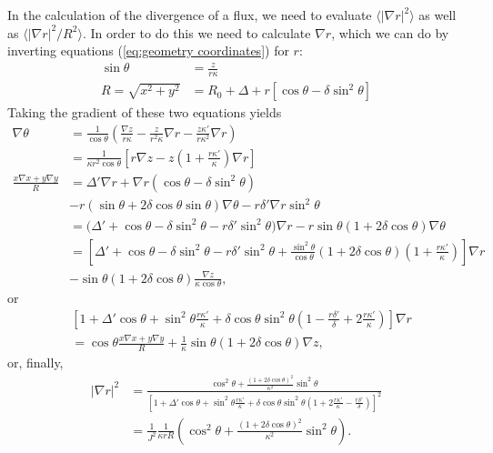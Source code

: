 \documentclass[11pt,a4paper]{article}
\begin{document}
In the calculation of the divergence of a flux, we need to evaluate $\langle |\nabla r|^2 \rangle$ as well as $\langle |\nabla r|^2/R^2\rangle$. In order to do this we need to calculate $\nabla r$, which  we can do by inverting equations (\ref{eq:geometry coordinates}) for $r$:
\begin{align}
\sin\theta &= \frac{z}{r\kappa} \nonumber \\
R = \sqrt{x^2+y^2} &= R_0 + \Delta + r[\cos\theta-\delta\sin^2\theta] %
\end{align}
Taking the gradient of these two equations yields
\begin{align}
\nabla \theta &= \frac{1}{\cos\theta} \left( \frac{\nabla z}{r\kappa} - \frac{z}{r^2\kappa}\nabla r - \frac{z\kappa'}{r\kappa^2}\nabla r\right)\nonumber \\
&= \frac{1}{\kappa r^2\cos\theta}\left[r\nabla z -z \left( 1+\frac{r\kappa'}{\kappa}\right)\nabla r\right] \nonumber \\
\frac{x\nabla x + y\nabla y}{R} &= \Delta' \nabla r + \nabla r (\cos\theta-\delta\sin^2\theta)  \nonumber \\
&-r(\sin\theta+2\delta\cos\theta\sin\theta)\nabla \theta - r\delta' \nabla r \sin^2\theta \nonumber \\
&=\Big(\Delta' + \cos\theta - \delta\sin^2\theta - r\delta' \sin^2\theta\Big) \nabla r - r\sin\theta(1+2\delta\cos\theta)\nabla \theta \nonumber \\
&= \left[\Delta' + \cos\theta - \delta\sin^2\theta - r\delta' \sin^2\theta + \frac{\sin^2\theta}{\cos\theta}(1+2\delta\cos\theta)\left(1+\frac{r\kappa'}{\kappa}\right) \right]\nabla r \nonumber \\
& - \sin\theta(1+2\delta\cos\theta)\frac{\nabla z}{\kappa \cos\theta},
\end{align}
or 
\begin{align}
&\left[1 + \Delta'\cos\theta +\sin^2\theta\frac{r\kappa'}{\kappa}+\delta\cos\theta\sin^2\theta \left(1-\frac{ r\delta'}{\delta}+ 2\frac{r\kappa'}{\kappa}\right)\right]\nabla r \nonumber \\
&= \cos\theta\frac{x\nabla x + y\nabla y}{R} + \frac{1}{\kappa}\sin\theta(1+2\delta\cos\theta)\nabla z ,
\end{align}
or, finally,
\begin{align}
|\nabla r|^2 &= \frac{\cos^2\theta + \frac{(1+2\delta\cos\theta)^2}{\kappa^2}\sin^2\theta}{\left[1 + \Delta'\cos\theta +\sin^2\theta\frac{r\kappa'}{\kappa}+\delta\cos\theta\sin^2\theta \left(1+ 2\frac{r\kappa'}{\kappa}-\frac{ r\delta'}{\delta}\right)\right]^2} \nonumber \\
&= \frac{1}{J^2}\frac{1}{\kappa r R} \left(\cos^2\theta + \frac{(1+2\delta\cos\theta)^2}{\kappa^2}\sin^2\theta\right).
\end{align}
\end{document}
